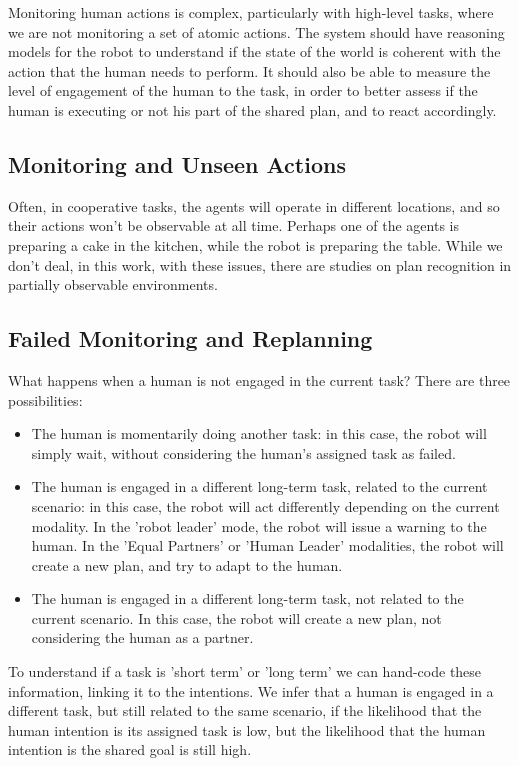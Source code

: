 Monitoring human actions is complex, particularly with high-level tasks, where we are not monitoring a set of atomic actions. The system should have reasoning models for the robot to understand if the state of the world is coherent with the action that the human needs to perform. It should also be able to measure the level of engagement of the human to the task, in order to better assess if the human is executing or not his part of the shared plan, and to react accordingly.

\subsection{Monitoring and Unseen Actions}
Often, in cooperative tasks, the agents will operate in different locations, and so their actions won't be observable at all time. Perhaps one of the agents is preparing a cake in the kitchen,  while the robot is preparing the table. While we don't deal, in this work, with these issues, there are studies on plan recognition in partially observable environments. %


\subsection{Failed Monitoring and Replanning}
What happens when a human is not engaged in the current task? There are three possibilities:
\begin{itemize}
\item The human is momentarily doing another task: in this case, the robot will simply wait, without considering the human's assigned task as failed.
\item The human is engaged in a different long-term task, related to the current scenario: in this case, the robot will act differently depending on the 
current modality. In the 'robot leader' mode, the robot will issue a warning to the human. In the 'Equal Partners' or 'Human Leader' modalities, the robot will create a new plan, and try to adapt to the human.  %
\item The human is engaged in a different long-term task, not related to the current scenario. In this case, the robot will create a new plan, not considering the human as a partner.
\end{itemize}

To understand if a task is 'short term' or 'long term' we can hand-code these information, linking it to the intentions. We infer that a human is engaged in a different task, but still related to the same scenario, if the likelihood that the human intention is its assigned task is low, but the likelihood that the human intention is the shared goal is still high. 



